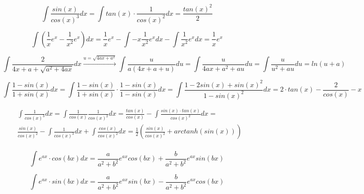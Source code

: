 \documentclass[./\jobname.tex]{subfiles}
\begin{document}
\noindent\makebox[\linewidth]{\rule{\paperwidth}{0.4pt}}

\begin{equation*}
	\int \frac{sin(x)}{cos(x)^3} dx = \int tan(x) \cdot \frac{1}{cos(x)^2} dx = \frac{tan(x)^2}{2}
\end{equation*}

\noindent\makebox[\linewidth]{\rule{\paperwidth}{0.4pt}}

\begin{equation*}
	\int \left( \frac{1}{x} e^x - \frac{1}{x^2} e^x \right) dx = \frac{1}{x} e^x - \int -x \frac{1}{x^2} e^x dx - \int \frac{1}{x^2} e^x dx = \frac{1}{x} e^x
\end{equation*}

\noindent\makebox[\linewidth]{\rule{\paperwidth}{0.4pt}}

\begin{equation*}
	\int \frac{2}{4x + a + \sqrt{a^2 + 4ax}} dx \xrightarrow{u = \sqrt{4ax + a^2}} \int \frac{u}{a(4x + a + u)} du = \int \frac{u}{4 ax + a^2 + au} du = \int \frac{u}{u^2 + au} du = ln(u + a)
\end{equation*}

\noindent\makebox[\linewidth]{\rule{\paperwidth}{0.4pt}}

\begin{equation*} 
\int \frac{1 - sin(x)}{1 + sin(x)} dx = \int \frac{1 - sin(x)}{1 + sin(x)} \cdot \frac{1 - sin(x)}{1 - sin(x)} dx = \int \frac{1 - 2 sin(x) + sin(x)^2}{1 - sin(x)^2} dx = 2 \cdot tan(x) - \frac{2}{cos(x)} - x
\end{equation*}

\noindent\makebox[\linewidth]{\rule{\paperwidth}{0.4pt}}

\begin{equation*}
	\begin{split}
	& \int \frac{1}{cos(x)^3} dx = \int \frac{1}{cos(x)} \frac{1}{cos(x)^2} dx = \frac{tan(x)}{cos(x)} - \int \frac{sin(x) \cdot tan(x)}{cos(x)^2} dx = \\ 
	& \frac{sin(x)}{cos(x)^2} - \int \frac{1}{cos(x)^3} dx + \int \frac{cos(x)}{cos(x)^2} dx = \frac{1}{2} \left( \frac{sin(x)}{cos(x)^2} + arctanh(sin(x)) \right) \\
	\end{split}
\end{equation*}

\noindent\makebox[\linewidth]{\rule{\paperwidth}{0.4pt}}

\begin{equation*}
	\int e^{ax} \cdot cos(bx) dx = \frac{a}{a^2 + b^2} e^{ax} cos(bx) + \frac{b}{a^2 + b^2} e^{ax} sin(bx)
\end{equation*}

\noindent\makebox[\linewidth]{\rule{\paperwidth}{0.4pt}}

\begin{equation*}
\int e^{ax} \cdot sin(bx) dx = \frac{a}{a^2 + b^2} e^{ax} sin(bx) - \frac{b}{a^2 + b^2} e^{ax} cos(bx)
\end{equation*}

\noindent\makebox[\linewidth]{\rule{\paperwidth}{0.4pt}}
\end{document}
